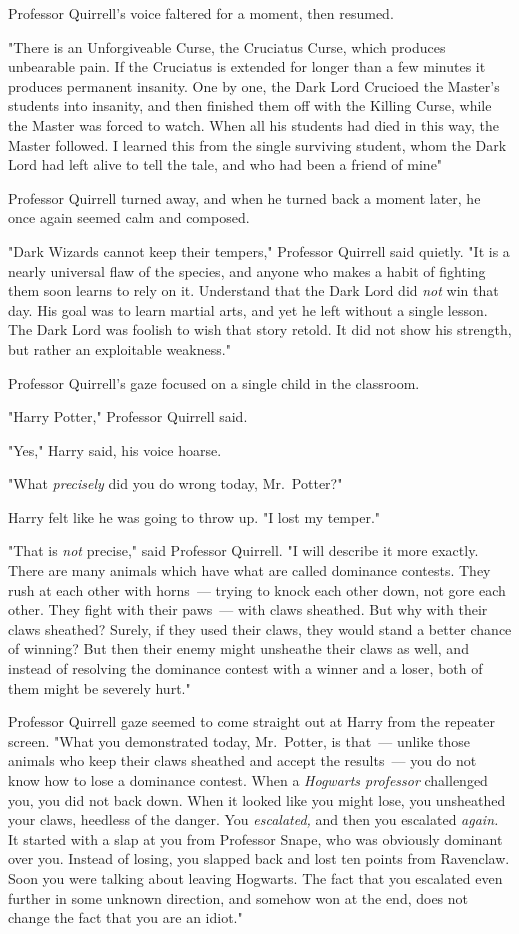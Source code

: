 Professor Quirrell's voice faltered for a moment, then resumed.

"There is an Unforgiveable Curse, the Cruciatus Curse, which produces
unbearable pain. If the Cruciatus is extended for longer than a few minutes it
produces permanent insanity. One by one, the Dark Lord Crucioed the Master's
students into insanity, and then finished them off with the Killing Curse,
while the Master was forced to watch. When all his students had died in this
way, the Master followed. I learned this from the single surviving student,
whom the Dark Lord had left alive to tell the tale, and who had been a friend
of mine{\el}"

Professor Quirrell turned away, and when he turned back a moment later, he once
again seemed calm and composed.

"Dark Wizards cannot keep their tempers," Professor Quirrell said quietly. "It
is a nearly universal flaw of the species, and anyone who makes a habit of
fighting them soon learns to rely on it. Understand that the Dark Lord did
\emph{not} win that day. His goal was to learn martial arts, and yet he left
without a single lesson. The Dark Lord was foolish to wish that story retold.
It did not show his strength, but rather an exploitable weakness."

Professor Quirrell's gaze focused on a single child in the classroom.

"Harry Potter," Professor Quirrell said.

"Yes," Harry said, his voice hoarse.

"What \emph{precisely} did you do wrong today, Mr.~Potter?"

Harry felt like he was going to throw up. "I lost my temper."

"That is \emph{not} precise," said Professor Quirrell. "I will describe it more
exactly. There are many animals which have what are called dominance contests.
They rush at each other with horns~--- trying to knock each other down, not gore
each other. They fight with their paws~--- with claws sheathed. But why with
their claws sheathed? Surely, if they used their claws, they would stand a
better chance of winning? But then their enemy might unsheathe their claws as
well, and instead of resolving the dominance contest with a winner and a loser,
both of them might be severely hurt."

Professor Quirrell gaze seemed to come straight out at Harry from the repeater
screen. "What you demonstrated today, Mr.~Potter, is that~--- unlike those
animals who keep their claws sheathed and accept the results~--- you do not know
how to lose a dominance contest. When a \emph{Hogwarts professor} challenged
you, you did not back down. When it looked like you might lose, you unsheathed
your claws, heedless of the danger. You \emph{escalated,} and then you
escalated \emph{again.} It started with a slap at you from Professor Snape, who
was obviously dominant over you. Instead of losing, you slapped back and lost
ten points from Ravenclaw. Soon you were talking about leaving Hogwarts. The
fact that you escalated even further in some unknown direction, and somehow won
at the end, does not change the fact that you are an idiot."

